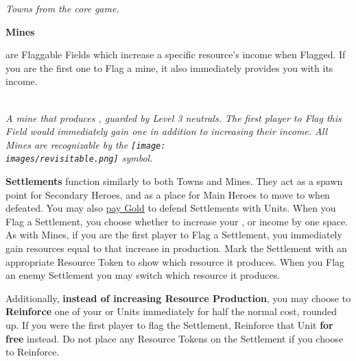 \begin{multicols*}{2}
\begin{center}
  \textit{Towns from the core game.}
\end{center}

\medskip

\hypertarget{Mines}{\textbf{Mines}} are Flaggable Fields which increase a specific resource's income when Flagged.
If you are the first one to Flag a mine, it also immediately provides you with its income.

\begin{center}
  \\
  \textit{A mine that produces , guarded by Level 3 neutrals.
    The first player to Flag this Field would immediately gain one  in addition to increasing their  income.
    All Mines are recognizable by the \texttt{[image: \\images/revisitable.png]} symbol.
  }
\end{center}

\textbf{Settlements} function similarly to both Towns and Mines.
They act as a spawn point for Secondary Heroes, and as a place for Main Heroes to move to when defeated.
You may also \hyperlink{Town}{pay Gold} to defend Settlements with Units.
When you Flag a Settlement, you choose whether to increase your ,  or  income by one space.
As with Mines, if you are the first player to Flag a Settlement, you immediately gain resources equal to that increase in production.
Mark the Settlement with an appropriate Resource Token to show which resource it produces.
When you Flag an enemy Settlement you may switch which resource it produces.\par
Additionally, \textbf{instead of increasing Resource Production}, you may choose to \textbf{Reinforce} one of your  or  Units immediately for half the normal cost, rounded up.
If you were the first player to flag the Settlement, Reinforce that Unit \textbf{for free} instead.
Do not place any Resource Tokens on the Settlement if you choose to Reinforce.

\bigbreak


\end{multicols*}
